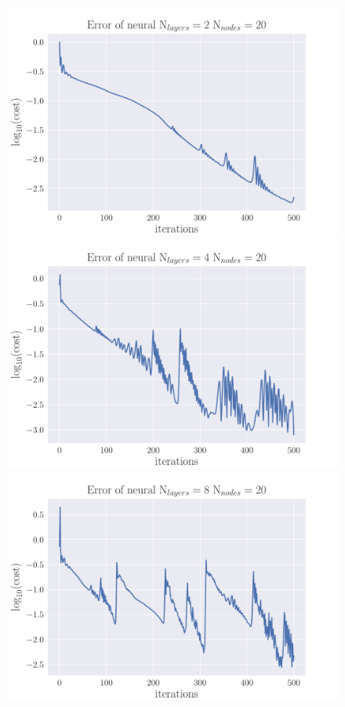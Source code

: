 \documentclass[12pt]{extarticle}
\begin{document}
\begin{figure}[h]
	\includegraphics[width=\linewidth]{../output/plots/NN_diffusion_error_Nn20_Nh2.pdf}
	\endminipage\hfill
	\includegraphics[width=\linewidth]{../output/plots/NN_diffusion_error_Nn20_Nh4.pdf}
	\endminipage\hfill
	\includegraphics[width=\linewidth]{../output/plots/NN_diffusion_error_Nn20_Nh8.pdf}

\end{figure}
\end{document}

